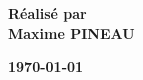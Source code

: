\begin{titlepage}
\begin{center}

\Large{\textbf{Réalisé par}} \\
\Large{\textbf{Maxime PINEAU}} 

\vfill

\large{\textbf{\today}}

\vfill



\end{center}

\end{titlepage}